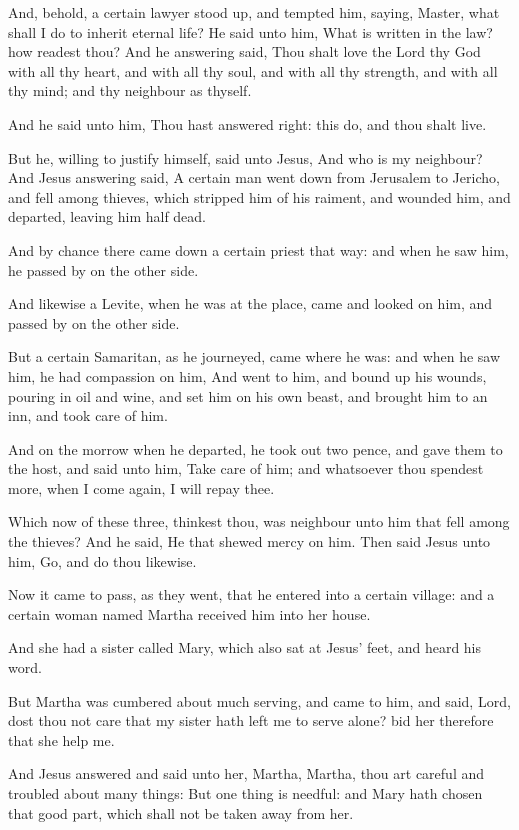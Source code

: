 \verse And, behold, a certain lawyer stood up, and tempted him, saying, Master, what shall I do to inherit eternal life?  \verse He said unto him, What is written in the law? how readest thou?  \verse And he answering said, Thou shalt love the Lord thy God with all thy heart, and with all thy soul, and with all thy strength, and with all thy mind; and thy neighbour as thyself.

\verse And he said unto him, Thou hast answered right: this do, and thou shalt live.

\verse But he, willing to justify himself, said unto Jesus, And who is my neighbour?  \verse And Jesus answering said, A certain man went down from Jerusalem to Jericho, and fell among thieves, which stripped him of his raiment, and wounded him, and departed, leaving him half dead.

\verse And by chance there came down a certain priest that way: and when he saw him, he passed by on the other side.

\verse And likewise a Levite, when he was at the place, came and looked on him, and passed by on the other side.

\verse But a certain Samaritan, as he journeyed, came where he was: and when he saw him, he had compassion on him, \verse And went to him, and bound up his wounds, pouring in oil and wine, and set him on his own beast, and brought him to an inn, and took care of him.

\verse And on the morrow when he departed, he took out two pence, and gave them to the host, and said unto him, Take care of him; and whatsoever thou spendest more, when I come again, I will repay thee.

\verse Which now of these three, thinkest thou, was neighbour unto him that fell among the thieves?  \verse And he said, He that shewed mercy on him. Then said Jesus unto him, Go, and do thou likewise.

\verse Now it came to pass, as they went, that he entered into a certain village: and a certain woman named Martha received him into her house.

\verse And she had a sister called Mary, which also sat at Jesus' feet, and heard his word.

\verse But Martha was cumbered about much serving, and came to him, and said, Lord, dost thou not care that my sister hath left me to serve alone?  bid her therefore that she help me.

\verse And Jesus answered and said unto her, Martha, Martha, thou art careful and troubled about many things: \verse But one thing is needful: and Mary hath chosen that good part, which shall not be taken away from her.


